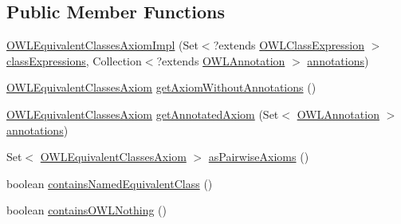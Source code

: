 \subsection*{Public Member Functions}
\begin{DoxyCompactItemize}
\item 
\hyperlink{classuk_1_1ac_1_1manchester_1_1cs_1_1owl_1_1owlapi_1_1_o_w_l_equivalent_classes_axiom_impl_a431c6999324ab0fbf942743c98408c43}{O\-W\-L\-Equivalent\-Classes\-Axiom\-Impl} (Set$<$?extends \hyperlink{interfaceorg_1_1semanticweb_1_1owlapi_1_1model_1_1_o_w_l_class_expression}{O\-W\-L\-Class\-Expression} $>$ \hyperlink{classuk_1_1ac_1_1manchester_1_1cs_1_1owl_1_1owlapi_1_1_o_w_l_nary_class_axiom_impl_a1f49ad91a00e2548f99a93ca8de82f7c}{class\-Expressions}, Collection$<$?extends \hyperlink{interfaceorg_1_1semanticweb_1_1owlapi_1_1model_1_1_o_w_l_annotation}{O\-W\-L\-Annotation} $>$ \hyperlink{classuk_1_1ac_1_1manchester_1_1cs_1_1owl_1_1owlapi_1_1_o_w_l_axiom_impl_af6fbf6188f7bdcdc6bef5766feed695e}{annotations})
\item 
\hyperlink{interfaceorg_1_1semanticweb_1_1owlapi_1_1model_1_1_o_w_l_equivalent_classes_axiom}{O\-W\-L\-Equivalent\-Classes\-Axiom} \hyperlink{classuk_1_1ac_1_1manchester_1_1cs_1_1owl_1_1owlapi_1_1_o_w_l_equivalent_classes_axiom_impl_a9d8afe6dbd29f6fc70789f94e9dadc3c}{get\-Axiom\-Without\-Annotations} ()
\item 
\hyperlink{interfaceorg_1_1semanticweb_1_1owlapi_1_1model_1_1_o_w_l_equivalent_classes_axiom}{O\-W\-L\-Equivalent\-Classes\-Axiom} \hyperlink{classuk_1_1ac_1_1manchester_1_1cs_1_1owl_1_1owlapi_1_1_o_w_l_equivalent_classes_axiom_impl_ae4051b2d42e8129ef183fbeab7f4fca5}{get\-Annotated\-Axiom} (Set$<$ \hyperlink{interfaceorg_1_1semanticweb_1_1owlapi_1_1model_1_1_o_w_l_annotation}{O\-W\-L\-Annotation} $>$ \hyperlink{classuk_1_1ac_1_1manchester_1_1cs_1_1owl_1_1owlapi_1_1_o_w_l_axiom_impl_af6fbf6188f7bdcdc6bef5766feed695e}{annotations})
\item 
Set$<$ \hyperlink{interfaceorg_1_1semanticweb_1_1owlapi_1_1model_1_1_o_w_l_equivalent_classes_axiom}{O\-W\-L\-Equivalent\-Classes\-Axiom} $>$ \hyperlink{classuk_1_1ac_1_1manchester_1_1cs_1_1owl_1_1owlapi_1_1_o_w_l_equivalent_classes_axiom_impl_a7efa95b722664891d01a50a683ba06f4}{as\-Pairwise\-Axioms} ()
\item 
boolean \hyperlink{classuk_1_1ac_1_1manchester_1_1cs_1_1owl_1_1owlapi_1_1_o_w_l_equivalent_classes_axiom_impl_ab25c807517a93364bbe33005b0b06ad0}{contains\-Named\-Equivalent\-Class} ()
\item 
boolean \hyperlink{classuk_1_1ac_1_1manchester_1_1cs_1_1owl_1_1owlapi_1_1_o_w_l_equivalent_classes_axiom_impl_a5bad50da666d0062d2205feed4248ed6}{contains\-O\-W\-L\-Nothing} ()

\end{DoxyCompactItemize}
